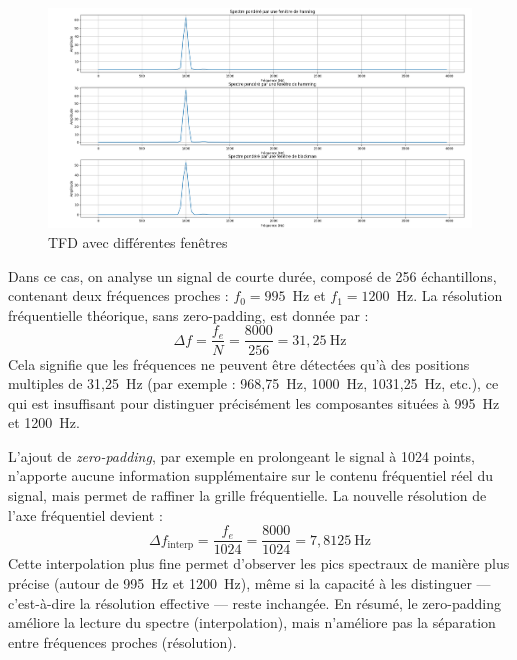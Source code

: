 \begin{figure}[h!]
    \centering
    \includegraphics[width=18cm]{screenshots/3_4_2_figures.png}
    \caption{TFD avec différentes fenêtres}
\end{figure}

Dans ce cas, on analyse un signal de courte durée, composé de 256 échantillons, contenant deux fréquences proches : $f_0 = 995$~Hz et $f_1 = 1200$~Hz. La résolution fréquentielle théorique, sans zero-padding, est donnée par :
\[
\Delta f = \frac{f_e}{N} = \frac{8000}{256} = 31{,}25~\text{Hz}
\]
Cela signifie que les fréquences ne peuvent être détectées qu'à des positions multiples de 31,25~Hz (par exemple : 968{,}75~Hz, 1000~Hz, 1031{,}25~Hz, etc.), ce qui est insuffisant pour distinguer précisément les composantes situées à 995~Hz et 1200~Hz.

L'ajout de \textit{zero-padding}, par exemple en prolongeant le signal à 1024 points, n'apporte aucune information supplémentaire sur le contenu fréquentiel réel du signal, mais permet de raffiner la grille fréquentielle. La nouvelle résolution de l'axe fréquentiel devient :
\[
\Delta f_{\text{interp}} = \frac{f_e}{1024} = \frac{8000}{1024} = 7{,}8125~\text{Hz}
\]
Cette interpolation plus fine permet d’observer les pics spectraux de manière plus précise (autour de 995~Hz et 1200~Hz), même si la capacité à les distinguer — c’est-à-dire la résolution effective — reste inchangée. En résumé, le zero-padding améliore la lecture du spectre (interpolation), mais n'améliore pas la séparation entre fréquences proches (résolution).
